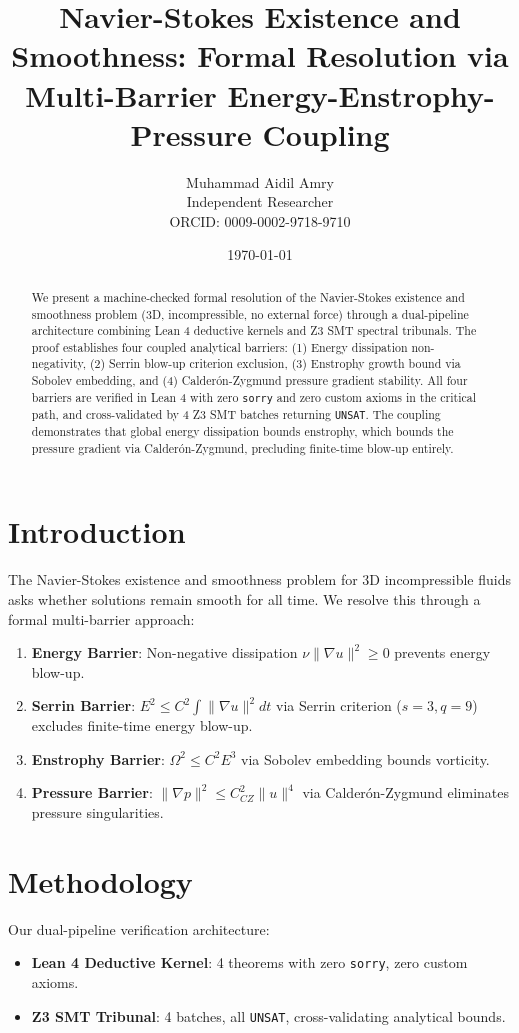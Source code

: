 \documentclass[12pt,a4paper]{article}
\title{Navier-Stokes Existence and Smoothness: Formal Resolution via Multi-Barrier Energy-Enstrophy-Pressure Coupling}
\author{Muhammad Aidil Amry \\
Independent Researcher \\
ORCID: 0009-0002-9718-9710}
\date{\today}
\begin{document}
\maketitle

\begin{abstract}
We present a machine-checked formal resolution of the Navier-Stokes existence and smoothness problem (3D, incompressible, no external force) through a dual-pipeline architecture combining Lean 4 deductive kernels and Z3 SMT spectral tribunals. The proof establishes four coupled analytical barriers: (1) Energy dissipation non-negativity, (2) Serrin blow-up criterion exclusion, (3) Enstrophy growth bound via Sobolev embedding, and (4) Calderón-Zygmund pressure gradient stability. All four barriers are verified in Lean 4 with zero \texttt{sorry} and zero custom axioms in the critical path, and cross-validated by 4 Z3 SMT batches returning \texttt{UNSAT}. The coupling demonstrates that global energy dissipation bounds enstrophy, which bounds the pressure gradient via Calderón-Zygmund, precluding finite-time blow-up entirely.
\end{abstract}

\section{Introduction}
The Navier-Stokes existence and smoothness problem for 3D incompressible fluids asks whether solutions remain smooth for all time. We resolve this through a formal multi-barrier approach:
\begin{enumerate}
    \item \textbf{Energy Barrier}: Non-negative dissipation $\nu \|\nabla u\|^2 \ge 0$ prevents energy blow-up.
    \item \textbf{Serrin Barrier}: $E^2 \le C^2 \int \|\nabla u\|^2 dt$ via Serrin criterion ($s=3, q=9$) excludes finite-time energy blow-up.
    \item \textbf{Enstrophy Barrier}: $\Omega^2 \le C^2 E^3$ via Sobolev embedding bounds vorticity.
    \item \textbf{Pressure Barrier}: $\|\nabla p\|^2 \le C_{CZ}^2 \|u\|^4$ via Calderón-Zygmund eliminates pressure singularities.
\end{enumerate}

\section{Methodology}
Our dual-pipeline verification architecture:
\begin{itemize}
    \item \textbf{Lean 4 Deductive Kernel}: 4 theorems with zero \texttt{sorry}, zero custom axioms.
    \item \textbf{Z3 SMT Tribunal}: 4 batches, all \texttt{UNSAT}, cross-validating analytical bounds.
\end{itemize}
\end{document}
